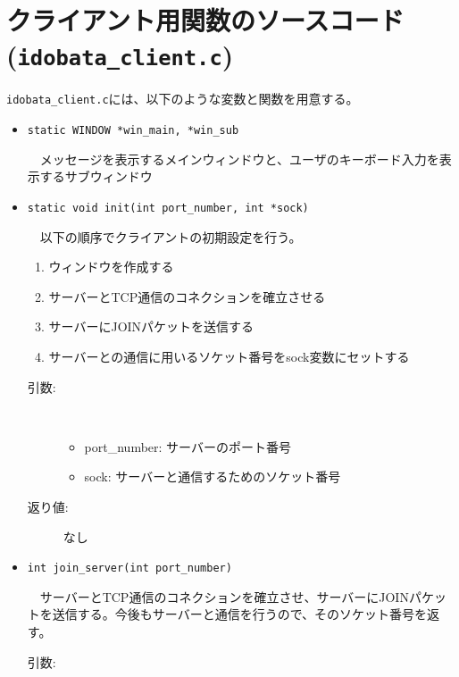 \documentclass[uplatex,dvipdfmx,11pt,a4paper]{jsarticle} %
\begin{document}
\section{クライアント用関数のソースコード({\tt idobata\_client.c})}
{\tt idobata\_client.c}には、以下のような変数と関数を用意する。


\begin{itemize}
    \item {\tt static WINDOW *win\_main, *win\_sub}

        　メッセージを表示するメインウィンドウと、ユーザのキーボード入力を表示するサブウィンドウ
        \newline
    \item {\tt static void init(int port\_number, int *sock)}

        　以下の順序でクライアントの初期設定を行う。
        \begin{enumerate}
            \item ウィンドウを作成する
            \item サーバーとTCP通信のコネクションを確立させる
            \item サーバーにJOINパケットを送信する
            \item サーバーとの通信に用いるソケット番号をsock変数にセットする
        \end{enumerate}
        \begin{description}
            \item[引数:] \ 

                \begin{itemize}
                        \item port\_number: サーバーのポート番号
                        \item sock: サーバーと通信するためのソケット番号
                \end{itemize}
            \item[返り値:] なし
            \newline
        \end{description}

    \item {\tt int join\_server(int port\_number)}

        　サーバーとTCP通信のコネクションを確立させ、サーバーにJOINパケットを送信する。今後もサーバーと通信を行うので、そのソケット番号を返す。
        \begin{description}
            \item[引数:] \ 


\end{description}
\end{itemize}
\end{document}
